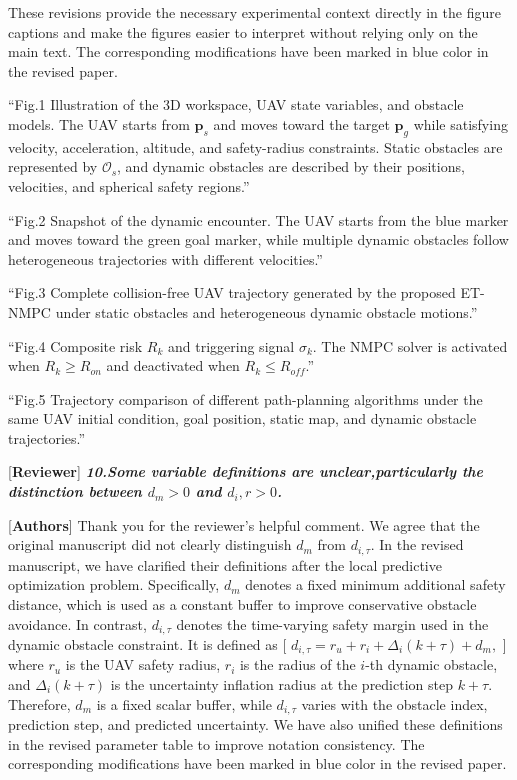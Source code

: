 \documentclass[12pt, twosides]{article}
\newcommand{\vect}[1]{\mathbf{#1}}
\theoremstyle{definition}
\begin{document}
These revisions provide the necessary experimental context directly in the figure captions and make the figures easier to interpret without relying only on the main text. The corresponding modifications have been marked in blue color in the revised paper.

``Fig.1 Illustration of the 3D workspace, UAV state variables, and obstacle models. The UAV starts from $\vect{p}_s$ and moves toward the target $\vect{p}_g$ while satisfying velocity, acceleration, altitude, and safety-radius constraints. Static obstacles are represented by $\mathcal{O}_s$, and dynamic obstacles are described by their positions, velocities, and spherical safety regions.''

``Fig.2 Snapshot of the dynamic encounter. The UAV starts from the blue marker and moves toward the green goal marker, while multiple dynamic obstacles follow heterogeneous trajectories with different velocities.''

``Fig.3 Complete collision-free UAV trajectory generated by the proposed ET-NMPC under static obstacles and heterogeneous dynamic obstacle motions.''

``Fig.4 Composite risk $R_k$ and triggering signal $\sigma_k$. The NMPC solver is activated when $R_k \ge R_{on}$ and deactivated when $R_k \le R_{off}$.''

``Fig.5 Trajectory comparison of different path-planning algorithms under the same UAV initial condition, goal position, static map, and dynamic obstacle trajectories.''

\textcolor[rgb]{0.00,0.00,1.00}{[\textbf {Reviewer}]} \textit{\textbf{10.Some variable definitions are unclear,particularly the distinction between $d_m > 0$ and $d_i,r > 0$.}}

\textcolor[rgb]{0.00,0.00,1.00}{[\textbf{Authors}]} Thank you for the reviewer's helpful comment. We agree that the original manuscript did not clearly distinguish $d_m$ from $d_{i,\tau}$. In the revised manuscript, we have clarified their definitions after the local predictive optimization problem. Specifically, $d_m$ denotes a fixed minimum additional safety distance, which is used as a constant buffer to improve conservative obstacle avoidance. In contrast, $d_{i,\tau}$ denotes the time-varying safety margin used in the dynamic obstacle constraint. It is defined as
[
$d_{i,\tau}=r_u+r_i+\Delta_i(k+\tau)+d_m,$
]
where $r_u$ is the UAV safety radius, $r_i$ is the radius of the $i$-th dynamic obstacle, and $\Delta_i(k+\tau)$ is the uncertainty inflation radius at the prediction step $k+\tau$. Therefore, $d_m$ is a fixed scalar buffer, while $d_{i,\tau}$ varies with the obstacle index, prediction step, and predicted uncertainty. We have also unified these definitions in the revised parameter table to improve notation consistency. The corresponding modifications have been marked in blue color in the revised paper.
\end{document}
